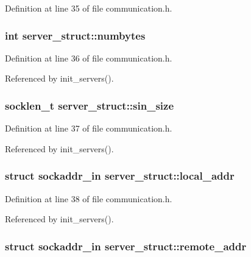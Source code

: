 Definition at line 35 of file communication.h.\hypertarget{structserver__struct_b56d302ce3497c35c81694b8f4d1e5d7}{
\subsubsection{\setlength{\rightskip}{0pt plus 5cm}int {\bf server\_\-struct::numbytes}}}
\label{structserver__struct_b56d302ce3497c35c81694b8f4d1e5d7}




Definition at line 36 of file communication.h.

Referenced by init\_\-servers().\hypertarget{structserver__struct_a4ae791fe60087000b9badae65f6a813}{
\subsubsection{\setlength{\rightskip}{0pt plus 5cm}socklen\_\-t {\bf server\_\-struct::sin\_\-size}}}
\label{structserver__struct_a4ae791fe60087000b9badae65f6a813}




Definition at line 37 of file communication.h.

Referenced by init\_\-servers().\hypertarget{structserver__struct_7ab2ae9f72357160310633ae3e1ae14c}{
\subsubsection{\setlength{\rightskip}{0pt plus 5cm}struct sockaddr\_\-in {\bf server\_\-struct::local\_\-addr}}}
\label{structserver__struct_7ab2ae9f72357160310633ae3e1ae14c}




Definition at line 38 of file communication.h.

Referenced by init\_\-servers().\hypertarget{structserver__struct_98c3d085937cf6ad2a5b600155088e79}{
\subsubsection{\setlength{\rightskip}{0pt plus 5cm}struct sockaddr\_\-in {\bf server\_\-struct::remote\_\-addr}}}
\label{structserver__struct_98c3d085937cf6ad2a5b600155088e79}




